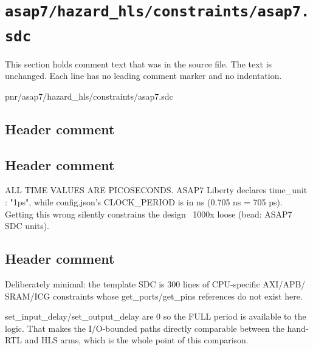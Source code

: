 \section{\texttt{asap7/hazard\_hls/constraints/asap7.sdc}}\label{tm:pd:asap7-hazard-hls-sdc}

This section holds comment text that was in the source file. The text is unchanged. Each line has no leading comment marker and no indentation.

\begin{relocated}{pnr/asap7/hazard_hls/constraints/asap7.sdc}

\subsection*{Header comment}


\subsection*{Header comment}

\begin{textblock}
ALL TIME VALUES ARE PICOSECONDS. ASAP7 Liberty declares time_unit : "1ps",
while config.json's CLOCK_PERIOD is in ns (0.705 ns = 705 ps). Getting this
wrong silently constrains the design ~1000x loose (bead: ASAP7 SDC units).
\end{textblock}

\subsection*{Header comment}

\begin{textblock}
Deliberately minimal: the template SDC is 300 lines of CPU-specific AXI/APB/
SRAM/ICG constraints whose get_ports/get_pins references do not exist here.

set_input_delay/set_output_delay are 0 so the FULL period is available to the
logic. That makes the I/O-bounded paths directly comparable between the
hand-RTL and HLS arms, which is the whole point of this comparison.
\end{textblock}

\end{relocated}

